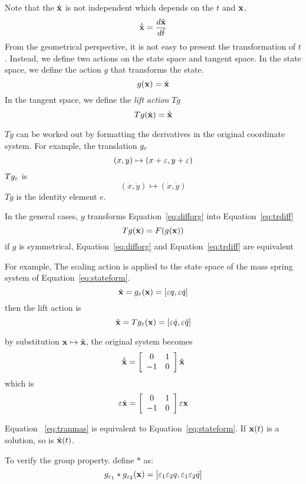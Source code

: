 Note that the $\dot{\mathbf{x}}$ is not independent which depends on the $t$ and $\mathbf{x}$,
\[
\dot{\tilde{\mathbf{x}}}=\frac{d \tilde{\mathbf{x}} }{d \tilde{t}}
\]
From the geometrical perspective, it is not easy to present  the transformation of $t$.
Instead, we define two actions on the state space and tangent space.
In the state space, we define the  action $g$ that transforms the state. 
\[
g(\mathbf{x})=\tilde{\mathbf{x}}
\]
In the tangent space, we define the \emph{lift action} $Tg$ 
\[
Tg(\dot{\mathbf{x}})=\dot{\tilde{\mathbf{x}}}
\]

$Tg$ can be worked out by formatting the derivatives in the original coordinate system.
For example, the translation $g_{\varepsilon}$ 
\[
(x,y)\mapsto (x+\varepsilon,y+\varepsilon)
\]
$Tg_{\varepsilon}$ is
\[
(\dot{x},\dot{y}) \mapsto (\dot{x},\dot{y})
\]
$Tg$ is the identity element $e$.


In the general cases, $g$ transforms Equation~\ref{eq:difforg} into Equation~\ref{eq:trdiff}
\begin{equation}
\label{eq:trdiff}
Tg(\dot{\mathbf{x}})=F(g(\mathbf{x}))
\end{equation}
if $g$ is symmetrical, Equation~\ref{eq:difforg} and Equation~\ref{eq:trdiff} are equivalent







 	
For example, 
The scaling action is applied to the state space of the mass spring system of Equation~\ref{eq:stateform}. 
\[
\tilde{\mathbf{x}}=g_{\varepsilon}(\mathbf{x})=[\varepsilon q, \varepsilon \dot{q} ]
\]
then the lift action is
\[
\tilde{\mathbf{x}}=Tg_{\varepsilon}(\mathbf{x})=[\varepsilon \dot{q}, \varepsilon \ddot{q}]
\]



by substitution $\mathbf{x} \mapsto \tilde{\mathbf{x}}$, the original system becomes
\[ 
\dot{\tilde{\mathbf{x}}}=
\left[ 
\begin{array}{cc}
0 &1\\
-1 &0 
\end{array}
\right]\tilde{\mathbf{x}}
\]
which is 
\begin{equation}
\label{eq:tranmas} 
\varepsilon \dot{\mathbf{x}}=
\left[ 
\begin{array}{cc}
0 &1\\
-1 &0 
\end{array}
\right]\varepsilon \mathbf{x}
\end{equation}

Equation ~\ref{eq:tranmas} is equivalent to  Equation~\ref{eq:stateform}.
If $\mathbf{x}(t)$ is a solution, so is $\tilde{\mathbf{x}}(t)$.

To verify the group property. define $*$ as:
\[
g_{\varepsilon_1}*g_{\varepsilon_2}(\mathbf{x})=[\varepsilon_1 \varepsilon_2 q, \varepsilon_1 \varepsilon_2 \dot{q}]
\]

